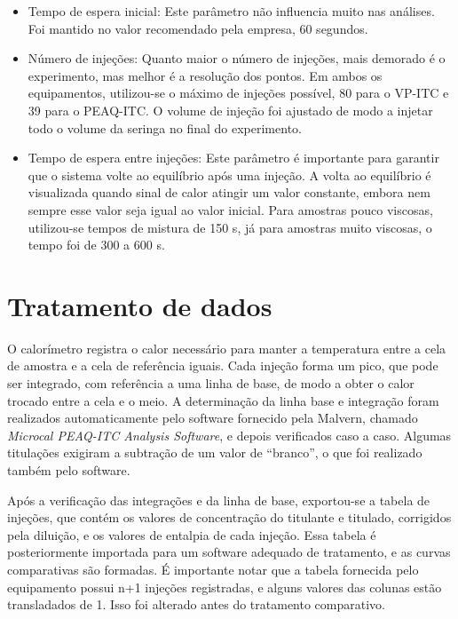 \begin{itemize}[noitemsep]
			\item Tempo de espera inicial: Este parâmetro não influencia muito nas análises. Foi mantido no valor recomendado pela empresa, 60 segundos.
			
			\item Número de injeções: Quanto maior o número de injeções, mais demorado é o experimento, mas melhor é a resolução dos pontos. Em ambos os equipamentos, utilizou-se o máximo de injeções possível, 80 para o VP-ITC e 39 para o PEAQ-ITC. O volume de injeção foi ajustado de modo a injetar todo o volume da seringa no final do experimento.
			
			\item Tempo de espera entre injeções: Este parâmetro é importante para garantir que o sistema volte ao equilíbrio após uma injeção. A volta ao equilíbrio é visualizada quando sinal de calor atingir um valor constante, embora nem sempre esse valor seja igual ao valor inicial. Para amostras pouco viscosas, utilizou-se tempos de mistura de 150 s, já para amostras muito viscosas, o tempo foi de 300 a 600 s.
		\end{itemize}
	
				
		\section{Tratamento de dados}
		
		O calorímetro registra o calor necessário para manter a temperatura entre a cela de amostra e a cela de referência iguais. Cada injeção forma um pico, que pode ser integrado, com referência a uma linha de base, de modo a obter o calor trocado entre a cela e o meio. A determinação da linha base e integração foram realizados automaticamente pelo software fornecido pela Malvern, chamado \emph{Microcal PEAQ-ITC Analysis Software}, e depois verificados caso a caso. Algumas titulações exigiram a subtração de um valor de ``branco'', o que foi realizado também pelo software.
		
		Após a verificação das integrações e da linha de base, exportou-se a tabela de injeções, que contém os valores de concentração do titulante e titulado, corrigidos pela diluição, e os valores de entalpia de cada injeção. Essa tabela é posteriormente importada para um software adequado de tratamento, e as curvas comparativas são formadas. É importante notar que a tabela fornecida pelo equipamento possui n+1 injeções registradas, e alguns valores das colunas estão transladados de 1. Isso foi alterado antes do tratamento comparativo.
		
